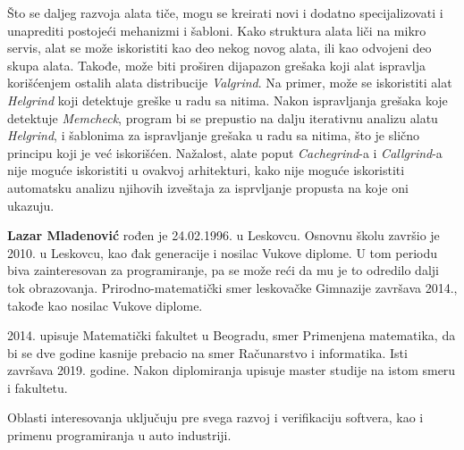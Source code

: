 \documentclass[12pt,oneside]{memoir}
\theoremstyle{plain}
\theoremstyle{definition}
\begin{document}
Što se daljeg razvoja alata tiče, mogu se kreirati novi i dodatno specijalizovati i unaprediti postojeći mehanizmi i šabloni. Kako struktura alata liči na mikro servis, alat se može iskoristiti kao deo nekog novog alata, ili kao odvojeni deo skupa alata. Takođe, može biti proširen dijapazon grešaka koji alat ispravlja korišćenjem ostalih alata distribucije \textit{Valgrind}. Na primer, može se iskoristiti alat \textit{Helgrind} koji detektuje greške u radu sa nitima. Nakon ispravljanja grešaka koje detektuje \textit{Memcheck}, program bi se prepustio na dalju iterativnu analizu alatu \textit{Helgrind}, i šablonima za ispravljanje grešaka u radu sa nitima, što je slično principu koji je već iskorišćen. Nažalost, alate poput \textit{Cachegrind}-a i \textit{Callgrind}-a nije moguće iskoristiti u ovakvoj arhitekturi, kako nije moguće iskoristiti automatsku analizu njihovih izveštaja za isprvljanje propusta na koje oni ukazuju.


\literatura

\backmatter

\begin{biografija}
  \textbf{Lazar Mladenović} rođen je 24.02.1996. u Leskovcu. Osnovnu školu završio je 2010. u Leskovcu, kao đak generacije i nosilac Vukove diplome. U tom periodu biva zainteresovan za programiranje, pa se može reći da mu je to odredilo dalji tok obrazovanja. Prirodno-matematički smer leskovačke Gimnazije završava 2014., takođe kao nosilac Vukove diplome.
  
  2014. upisuje Matematički fakultet u Beogradu, smer Primenjena matematika, da bi se  dve godine kasnije prebacio na smer Računarstvo i informatika. Isti završava 2019. godine. Nakon diplomiranja upisuje master studije na istom smeru i fakultetu. 
  
  Oblasti interesovanja uključuju pre svega razvoj i verifikaciju softvera, kao i primenu programiranja u auto industriji.  
    
\end{biografija}
\end{document}
